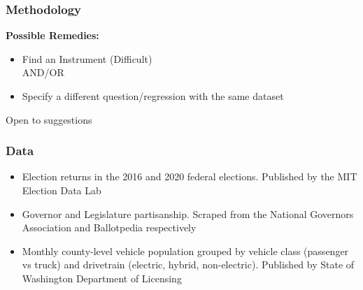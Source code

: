 \documentclass{beamer}
\begin{document}
\begin{frame}
\frametitle{Methodology}

\textbf{Possible Remedies:} 

\vspace{5mm}

\begin{itemize}
    \item Find an Instrument (Difficult) 
    \\
    \vspace{5mm}
    AND/OR
    \vspace{5mm}
    \item Specify a different question/regression with the same dataset
\end{itemize}

\vspace{5mm}

Open to suggestions

\end{frame}

\begin{frame}
\frametitle{Data}

\begin{itemize}
    \item {} Election returns in the 2016 and 2020 federal elections. Published by the MIT Election Data Lab
    \item {} Governor and Legislature partisanship. Scraped from the National Governors Association and Ballotpedia respectively
    \item {} Monthly county-level vehicle population grouped by vehicle class (passenger vs truck) and drivetrain (electric, hybrid, non-electric). Published by State of Washington Department of Licensing
    
\end{itemize}

\end{frame}
\end{document}
